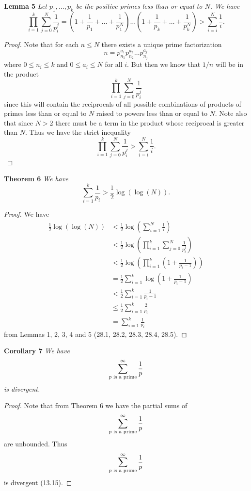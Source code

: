 \documentclass{article}
\begin{document}
\begin{flushleft}
\textbf{Lemma 5}
\textsl{Let $p_1, \dots , p_k$ be the positive primes less than or equal to $N$. We have
\[
\prod_{i=1}^k \sum_{j=0}^N \frac{1}{p_i^j} = \left ( 1 + \frac{1}{p_1} + \dots + \frac{1}{p_1^N} \right ) \dots \left ( 1 + \frac{1}{p_k} + \dots + \frac{1}{p_k^N} \right ) > \sum_{i=i}^N \frac{1}{i}.
\]}
\begin{proof}
Note that for each $n \leq N$ there exists a unique prime factorization
\[
n = p_{n_1}^{a_1}p_{n_2}^{a_2} \dots p_{n_j}^{a_j}
\]
where $0 \leq n_i \leq k$ and $0 \leq a_i \leq N$ for all $i$. But then we know that $1/n$ will be in the product
\[
\prod_{i=1}^k \sum_{j=0}^N \frac{1}{p_i^j}
\]
since this will contain the reciprocals of all possible combinations of products of primes less than or equal to $N$ raised to powers less than or equal to $N$. Note also that since $N > 2$ there must be a term in the product whose reciprocal is greater than $N$. Thus we have the strict inequality
\[
\prod_{i=1}^k \sum_{j=0}^N \frac{1}{p_i^j} > \sum_{i=i}^N \frac{1}{i}.
\]
\end{proof}

\textbf{Theorem 6}
\textsl{We have
\[
\sum_{i=1}^k \frac{1}{p_i} > \frac{1}{2} \log ( \log ( N ) ).
\]}
\begin{proof}
We have
\begin{align*}
\frac{1}{2} \log (\log(N)) &< \frac{1}{2} \log \left ( \sum_{i=1}^N \frac{1}{i} \right ) \\
					&< \frac{1}{2} \log \left ( \prod_{i=1}^k \sum_{j=0}^N \frac{1}{p_i^j} \right ) \\
					&< \frac{1}{2} \log \left ( \prod_{i=1}^k \left ( 1 + \frac{1}{p_i-1} \right ) \right ) \\
					&= \frac{1}{2} \sum_{i=1}^k \log \left ( 1 + \frac{1}{p_i-1} \right ) \\
					&< \frac{1}{2} \sum_{i=1}^k \frac{1}{p_i-1} \\
					&\leq \frac{1}{2} \sum_{i=1}^k \frac{2}{p_i} \\
					&= \sum_{i=1}^k \frac{1}{p_i}
\end{align*}
from Lemmas 1, 2, 3, 4 and 5 (28.1, 28.2, 28.3, 28.4, 28.5).
\end{proof}

\textbf{Corollary 7}
\textsl{We have
\[
\sum_{\textup{$p$ is a prime}}^{\infty} \frac{1}{p}
\]
is divergent.}
\begin{proof}
Note that from Theorem 6 we have the partial sums of
\[
\sum_{\textup{$p$ is a prime}}^{\infty} \frac{1}{p}
\]
are unbounded. Thus
\[
\sum_{\textup{$p$ is a prime}}^{\infty} \frac{1}{p}
\]
is divergent (13.15).
\end{proof}

\end{flushleft}
\end{document}
